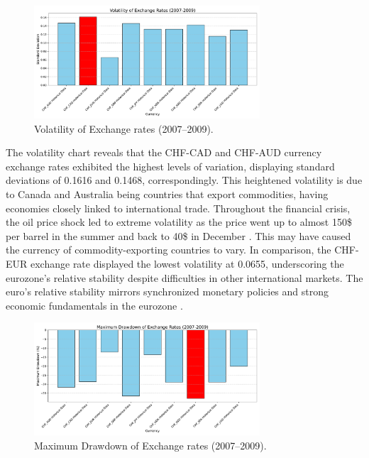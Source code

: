 \documentclass[11pt,a4paper,english,oneside]{book}
\begin{document}
\begin{figure}[h!]
    \centering
    \includegraphics[width=0.75\textwidth]{images/volatility_2007_2009.pdf}
    \caption{Volatility of Exchange rates (2007--2009).}
    \label{fig:volatility_2007_2009}
\end{figure}

The volatility chart reveals that the CHF-CAD and CHF-AUD currency exchange rates exhibited the highest levels of variation, displaying standard deviations of 0.1616 and 0.1468, correspondingly. This heightened volatility is due to Canada and Australia being countries that export commodities, having economies closely linked to international trade. Throughout the financial crisis, the oil price shock led to extreme volatility as the price went up to almost 150\$ per barrel in the summer and back to 40\$ in December \parencite{behr20092008}. This may have caused the currency of commodity-exporting countries to vary. In comparison, the CHF-EUR exchange rate displayed the lowest volatility at 0.0655, underscoring the eurozone's relative stability despite difficulties in other international markets. The euro's relative stability mirrors synchronized monetary policies and strong economic fundamentals in the eurozone \parencite{lane2012european}.

\begin{figure}[h!]
    \centering
    \includegraphics[width=0.75\textwidth]{images/maximum_drawdown_2007_2009.pdf}
    \caption{Maximum Drawdown of Exchange rates (2007--2009).}
    \label{fig:maximum_drawdown_2007_2009}
\end{figure}
\end{document}
